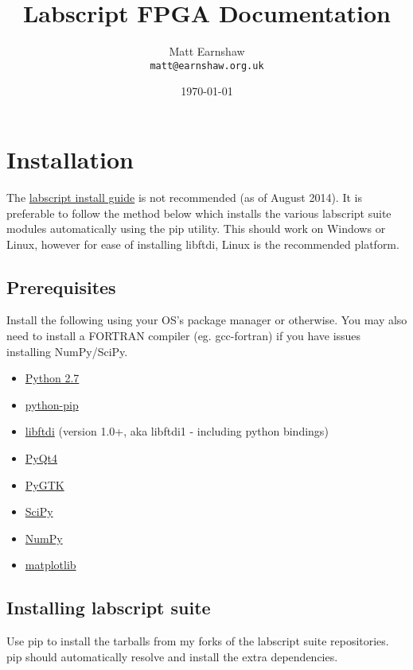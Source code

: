 \documentclass[11pt,a4paper]{article}
\begin{document}
\title{Labscript FPGA Documentation}
\author{Matt Earnshaw \\ \texttt{matt@earnshaw.org.uk}}
\date{\mydate\today}
\maketitle

\tableofcontents 
\newpage

\section{Installation}
The \href{https://bitbucket.org/labscript_suite/install-guide/src}{labscript install guide} is not recommended (as of August 2014). It is preferable to follow the method below which installs the various labscript suite modules automatically using the pip utility. This should work on Windows or Linux, however for ease of installing libftdi, Linux is the recommended platform.

\subsection{Prerequisites}
Install the following using your OS's package manager or otherwise. You may also need to install a FORTRAN compiler (eg. gcc-fortran) if you have issues installing NumPy/SciPy.

\begin{itemize}
\itemsep1pt\parskip0pt
\item \href{http://www.python.org}{Python 2.7}
\item \href{https://pypi.python.org/pypi/pip}{python-pip}
\item \href{http://www.intra2net.com/en/developer/libftdi/}{libftdi} (version 1.0+, aka libftdi1 - including python bindings)
\item \href{http://www.riverbankcomputing.co.uk/software/pyqt/download}{PyQt4}
\item \href{http://www.pygtk.org/}{PyGTK}
\item \href{http://www.scipy.org}{SciPy}
\item \href{http://www.numpy.org}{NumPy}
\item \href{http://www.matplotlib.org}{matplotlib}
\end{itemize}


\subsection{Installing labscript suite}
Use pip to install the tarballs from my forks of the labscript suite repositories. pip should automatically resolve and install the extra dependencies. \\
\end{document}
